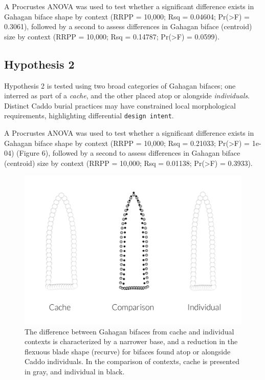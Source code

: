 \documentclass[]{interact}
\theoremstyle{plain}%
\theoremstyle{definition}
\theoremstyle{remark}
\begin{document}
A Procrustes ANOVA was used to test whether a significant difference
exists in Gahagan biface shape by context (RRPP = 10,000; Rsq = 0.04604;
Pr(\textgreater F) = 0.3061), followed by a second to assess differences
in Gahagan biface (centroid) size by context (RRPP = 10,000; Rsq =
0.14787; Pr(\textgreater F) = 0.0599).

\hypertarget{hypothesis-2-1}{%
\subsection{Hypothesis 2}\label{hypothesis-2-1}}

Hypothesis 2 is tested using two broad categories of Gahagan bifaces;
one interred as part of a \emph{cache}, and the other placed atop or
alongside \emph{individuals}. Distinct Caddo burial practices may have
constrained local morphological requirements, highlighting differential
\texttt{design\ intent}.

A Procrustes ANOVA was used to test whether a significant difference
exists in Gahagan biface shape by context (RRPP = 10,000; Rsq = 0.21033;
Pr(\textgreater F) = 1e-04) (Figure 6), followed by a second to assess
differences in Gahagan biface (centroid) size by context (RRPP = 10,000;
Rsq = 0.01138; Pr(\textgreater F) = 0.3933).

\begin{figure}

{\centering \includegraphics[width=1\linewidth]{img/fig05} 

}

\caption{The difference between Gahagan bifaces from cache and individual contexts is characterized by a narrower base, and a reduction in the flexuous blade shape (recurve) for bifaces found atop or alongside Caddo individuals. In the comparison of contexts, cache is presented in gray, and individual in black.}\label{fig:mshape.bpractice}
\end{figure}
\end{document}
